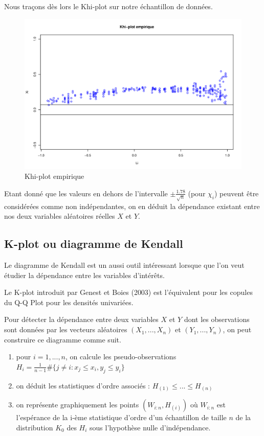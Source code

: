 Nous traçons dès lors le Khi-plot sur notre échantillon de données.

\noindent%
\begin{figure}[H]
    \begin{center}
      \includegraphics[width=14 cm, angle=0]{./pictures/chi_plot_empir.png}
      \centering\caption{Khi-plot empirique}
    \end{center}
\end{figure}

Etant donné que les valeurs en dehors de l'intervalle $\pm \frac{1.78}{\sqrt{n}}$ (pour $\chi_i$) peuvent être considérées comme non indépendantes, on en déduit
la dépendance existant entre nos deux variables aléatoires réelles $X$ et $Y$. 

\subsection{K-plot ou diagramme de Kendall}

Le diagramme de Kendall est un aussi outil intéressant lorsque que l'on veut étudier la dépendance entre les variables d'intérêts.

Le K-plot introduit par Genest et Boies (2003) est l'équivalent pour les copules du Q-Q Plot pour les
densités univariées.

Pour détecter la dépendance entre deux variables $X$ et $Y$ dont les observations sont données par les vecteurs aléatoires $(X_1,...,X_n)$ et
$(Y_1,...,Y_n)$, on peut construire ce diagramme comme suit.

\begin{enumerate}
\item pour $i=1,...,n$, on calcule les pseudo-observations $H_i = \frac{1}{n-1} \# \{j \neq i : x_j \leq x_i, y_j \leq y_i \}$
\item on déduit les statistiques d'ordre associés : $H_{(1)} \leq ... \leq H_{(n)}$
\item on représente graphiquement les points $(W_{i:n},H_{(i)})$ où $W_{i:n}$ est l'espérance de la i-ème statistique d'ordre 
d'un échantillon de taille $n$ de la distribution $K_0$ des $H_i$ sous l'hypothèse nulle d'indépendance.
\end{enumerate}

